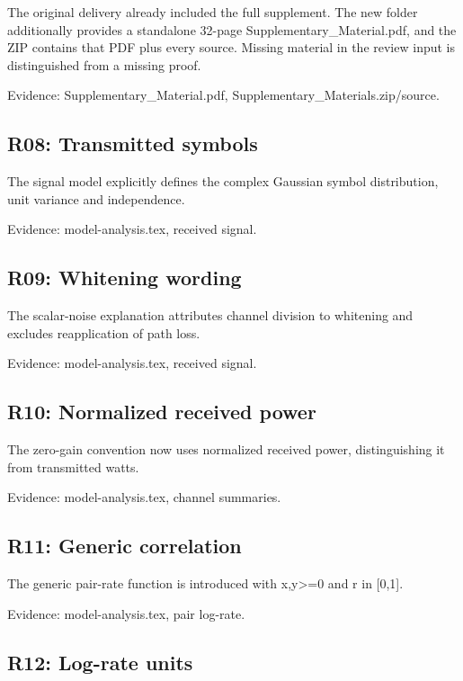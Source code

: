 \documentclass[10pt]{article}
\begin{document}
The original delivery already included the full supplement. The new folder additionally provides a standalone 32-page Supplementary\_\allowbreak Material.pdf, and the ZIP contains that PDF plus every source. Missing material in the review input is distinguished from a missing proof.

{\small Evidence: Supplementary\_\allowbreak Material.pdf, Supplementary\_\allowbreak Materials.zip/\allowbreak source.}

\subsection*{R08: Transmitted symbols}

The signal model explicitly defines the complex Gaussian symbol distribution, unit variance and independence.

{\small Evidence: model-analysis.tex, received signal.}

\subsection*{R09: Whitening wording}

The scalar-noise explanation attributes channel division to whitening and excludes reapplication of path loss.

{\small Evidence: model-analysis.tex, received signal.}

\subsection*{R10: Normalized received power}

The zero-gain convention now uses normalized received power, distinguishing it from transmitted watts.

{\small Evidence: model-analysis.tex, channel summaries.}

\subsection*{R11: Generic correlation}

The generic pair-rate function is introduced with x,y>=0 and r in [0,1].

{\small Evidence: model-analysis.tex, pair log-rate.}

\subsection*{R12: Log-rate units}
\end{document}
